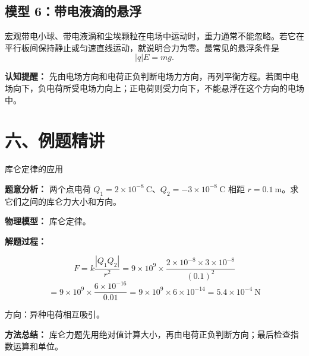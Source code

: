 \subsection*{模型 6：带电液滴的悬浮}

宏观带电小球、带电液滴和尘埃颗粒在电场中运动时，重力通常不能忽略。若它在平行板间保持静止或匀速直线运动，就说明合力为零。最常见的悬浮条件是
\[
|q|E=mg.
\]
\begin{center}


\label{fig:charged-droplet-suspension}
\end{center}

\textbf{认知提醒：} 先由电场方向和电荷正负判断电场力方向，再列平衡方程。若图中电场向下，负电荷所受电场力向上；正电荷则受力向下，不能悬浮在这个方向的电场中。

\section*{六、例题精讲}

\begin{examplebox}{库仑定律的应用}

\textbf{题意分析：} 两个点电荷 $Q_1 = 2 \times 10^{-8}\ \mathrm{C}$、$Q_2 = -3 \times 10^{-8}\ \mathrm{C}$ 相距 $r = 0.1\ \mathrm{m}$。求它们之间的库仑力大小和方向。

\textbf{物理模型：} 库仑定律。

\begin{center}


\label{fig:example-coulomb-attraction}
\end{center}

\textbf{解题过程：}

\[
F = k\frac{|Q_1 Q_2|}{r^2} = 9 \times 10^9 \times \frac{2 \times 10^{-8} \times 3 \times 10^{-8}}{(0.1)^2}
\]
\[
= 9 \times 10^9 \times \frac{6 \times 10^{-16}}{0.01} = 9 \times 10^9 \times 6 \times 10^{-14} = 5.4 \times 10^{-4}\ \mathrm{N}
\]

方向：异种电荷相互吸引。

\textbf{方法总结：} 库仑力题先用绝对值计算大小，再由电荷正负判断方向；最后检查指数运算和单位。

\end{examplebox}

